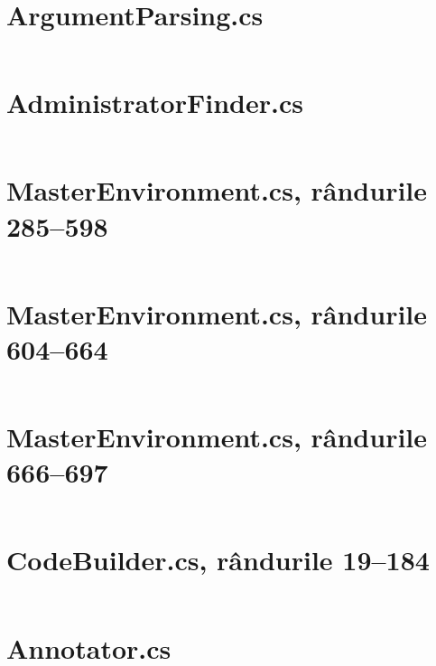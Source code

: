 \documentclass[a4paper,12pt]{report}
\begin{document}
\clearpage\section{ArgumentParsing.cs}\label{appendix:Kari____Kari_source_Kari_Arguments_ArgumentParsing}
\inputminted{cs}{../Kari/source/Kari.Arguments/ArgumentParsing.cs}

\clearpage\section{AdministratorFinder.cs}\label{appendix:Kari____Kari_source_Kari_GeneratorCore_Workflow_AdministratorFinder}
\inputminted{cs}{../Kari/source/Kari.GeneratorCore/Workflow/AdministratorFinder.cs}

\clearpage\section{MasterEnvironment.cs, rândurile 285--598}\label{appendix:Kari____Kari_source_Kari_GeneratorCore_Workflow_MasterEnvironment_285_598}
\inputminted[firstline=285, lastline=598]{cs}{../Kari/source/Kari.GeneratorCore/Workflow/MasterEnvironment.cs}

\clearpage\section{MasterEnvironment.cs, rândurile 604--664}\label{appendix:Kari____Kari_source_Kari_GeneratorCore_Workflow_MasterEnvironment_604_664}
\inputminted[firstline=604, lastline=664]{cs}{../Kari/source/Kari.GeneratorCore/Workflow/MasterEnvironment.cs}

\clearpage\section{MasterEnvironment.cs, rândurile 666--697}\label{appendix:Kari____Kari_source_Kari_GeneratorCore_Workflow_MasterEnvironment_666_697}
\inputminted[firstline=666, lastline=697]{cs}{../Kari/source/Kari.GeneratorCore/Workflow/MasterEnvironment.cs}

\clearpage\section{CodeBuilder.cs, rândurile 19--184}\label{appendix:Kari____Kari_source_Kari_Utils_CodeBuilder_19_184}
\inputminted[firstline=19, lastline=184]{cs}{../Kari/source/Kari.Utils/CodeBuilder.cs}

\clearpage\section{Annotator.cs}\label{appendix:Kari____Kari_source_Kari_Annotator_Annotator}
\inputminted{cs}{../Kari/source/Kari.Annotator/Annotator.cs}
\end{document}
